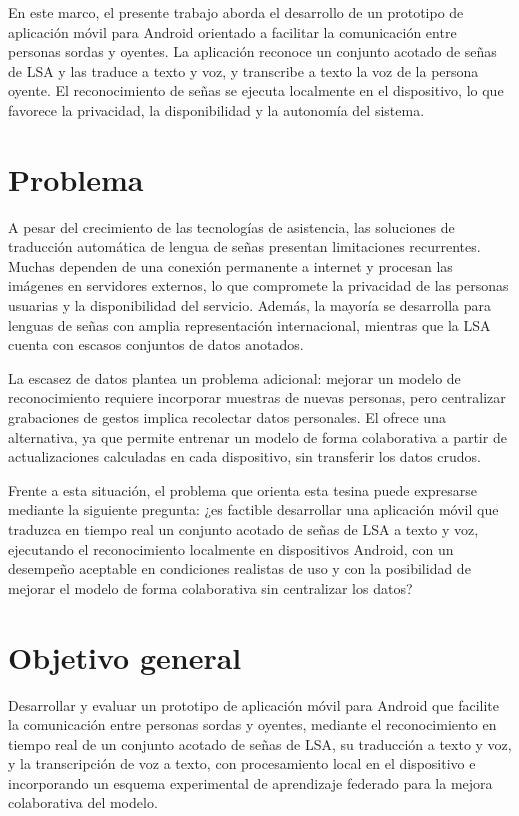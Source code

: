 En este marco, el presente trabajo aborda el desarrollo de un prototipo de aplicación móvil para Android orientado a facilitar la comunicación entre personas sordas y oyentes. La aplicación reconoce un conjunto acotado de señas de LSA y las traduce a texto y voz, y transcribe a texto la voz de la persona oyente. El reconocimiento de señas se ejecuta localmente en el dispositivo, lo que favorece la privacidad, la disponibilidad y la autonomía del sistema.

\section{Problema}

A pesar del crecimiento de las tecnologías de asistencia, las soluciones de traducción automática de lengua de señas presentan limitaciones recurrentes. Muchas dependen de una conexión permanente a internet y procesan las imágenes en servidores externos, lo que compromete la privacidad de las personas usuarias y la disponibilidad del servicio. Además, la mayoría se desarrolla para lenguas de señas con amplia representación internacional, mientras que la LSA cuenta con escasos conjuntos de datos anotados.

La escasez de datos plantea un problema adicional: mejorar un modelo de reconocimiento requiere incorporar muestras de nuevas personas, pero centralizar grabaciones de gestos implica recolectar datos personales. El  ofrece una alternativa, ya que permite entrenar un modelo de forma colaborativa a partir de actualizaciones calculadas en cada dispositivo, sin transferir los datos crudos.

Frente a esta situación, el problema que orienta esta tesina puede expresarse mediante la siguiente pregunta: ¿es factible desarrollar una aplicación móvil que traduzca en tiempo real un conjunto acotado de señas de LSA a texto y voz, ejecutando el reconocimiento localmente en dispositivos Android, con un desempeño aceptable en condiciones realistas de uso y con la posibilidad de mejorar el modelo de forma colaborativa sin centralizar los datos?

\section{Objetivo general}

Desarrollar y evaluar un prototipo de aplicación móvil para Android que facilite la comunicación entre personas sordas y oyentes, mediante el reconocimiento en tiempo real de un conjunto acotado de señas de LSA, su traducción a texto y voz, y la transcripción de voz a texto, con procesamiento local en el dispositivo e incorporando un esquema experimental de aprendizaje federado para la mejora colaborativa del modelo.

